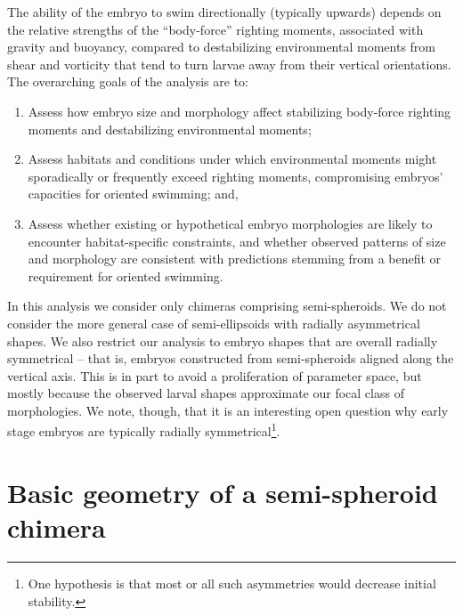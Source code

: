 \documentclass[10pt,a4paper]{article}
\begin{document}
The ability of the embryo to swim directionally (typically upwards) depends on the relative strengths of the ``body-force'' righting moments, associated with gravity and buoyancy, compared to destabilizing environmental moments from shear and vorticity that tend to turn larvae away from their vertical orientations.
The overarching goals of the analysis are to:
\begin{enumerate}
	\item Assess how embryo size and morphology affect stabilizing body-force righting moments and destabilizing environmental moments; 
	\item Assess habitats and conditions under which environmental moments might sporadically or frequently exceed righting moments, compromising embryos' capacities for oriented swimming; and, 
	\item Assess whether existing or hypothetical embryo morphologies are likely to encounter habitat-specific constraints, and whether observed patterns of size and morphology are consistent with predictions stemming from a benefit or requirement for oriented swimming.
\end{enumerate}
In this analysis we consider only chimeras comprising semi-spheroids.
We do not consider the more general case of semi-ellipsoids with radially asymmetrical shapes.
We also restrict our analysis to embryo shapes that are overall radially symmetrical -- that is, embryos constructed from semi-spheroids aligned along the vertical axis. 
This is in part to avoid a proliferation of parameter space, but mostly because the observed larval shapes approximate our focal class of morphologies. 
We note, though, that it is an interesting open question why early stage embryos are typically radially symmetrical\footnote{One hypothesis is that most or all such asymmetries would decrease initial stability.}. 

\section{Basic geometry of a semi-spheroid chimera}\label{GeomSect}
\end{document}

